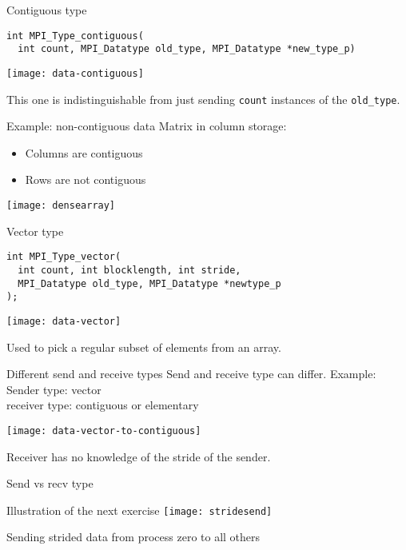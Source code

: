 \begin{numberedframe}{Contiguous type}
\lstset{language=C}
\begin{lstlisting}
int MPI_Type_contiguous(
  int count, MPI_Datatype old_type, MPI_Datatype *new_type_p)  
\end{lstlisting}
  \texttt{[image: data-contiguous]}

This one is indistinguishable from just sending \lstinline{count} instances
of the \lstinline{old_type}.
\end{numberedframe}

\begin{numberedframe}{Example: non-contiguous data}
  Matrix in column storage:
  \begin{itemize}
  \item Columns are contiguous
  \item Rows are not contiguous
  \end{itemize}
  \texttt{[image: densearray]}
\end{numberedframe}

\begin{numberedframe}{Vector type}
\begin{lstlisting}
int MPI_Type_vector(
  int count, int blocklength, int stride,
  MPI_Datatype old_type, MPI_Datatype *newtype_p
);  
\end{lstlisting}
  \texttt{[image: data-vector]}

Used to pick a regular subset of elements from an array.
\end{numberedframe}

\begin{numberedframe}{Different send and receive types}
  Send and receive type can differ. Example:\\
  Sender type: vector\\ receiver type: contiguous or elementary

  \texttt{[image: data-vector-to-contiguous]}

  Receiver has no knowledge of the stride of the sender.
\end{numberedframe}

\begin{numberedframe}{Send vs recv type}
\end{numberedframe}

\begin{numberedframe}{Illustration of the next exercise}
  \label{fig:stridesend}
  \texttt{[image: stridesend]}

  Sending strided data from process zero to all others
\end{numberedframe}

